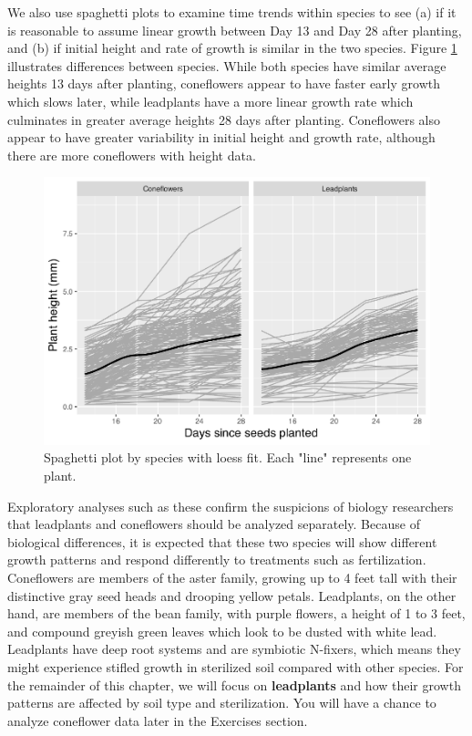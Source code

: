 \documentclass[
]{krantz}
\begin{document}
We also use spaghetti plots to examine time trends within species to see (a) if it is reasonable to assume linear growth between Day 13 and Day 28 after planting, and (b) if initial height and rate of growth is similar in the two species. Figure \ref{fig:spagbyspec} illustrates differences between species. While both species have similar average heights 13 days after planting, coneflowers appear to have faster early growth which slows later, while leadplants have a more linear growth rate which culminates in greater average heights 28 days after planting. Coneflowers also appear to have greater variability in initial height and growth rate, although there are more coneflowers with height data.

\begin{figure}

{\centering \includegraphics[width=0.6\linewidth]{bookdown-BeyondMLR_files/figure-latex/spagbyspec-1} 

}

\caption{Spaghetti plot by species with loess fit.  Each "line" represents one plant.}\label{fig:spagbyspec}
\end{figure}

Exploratory analyses such as these confirm the suspicions of biology researchers that leadplants and coneflowers should be analyzed separately. Because of biological differences, it is expected that these two species will show different growth patterns and respond differently to treatments such as fertilization. Coneflowers are members of the aster family, growing up to 4 feet tall with their distinctive gray seed heads and drooping yellow petals. Leadplants, on the other hand, are members of the bean family, with purple flowers, a height of 1 to 3 feet, and compound greyish green leaves which look to be dusted with white lead. Leadplants have deep root systems and are symbiotic N-fixers, which means they might experience stifled growth in sterilized soil compared with other species. For the remainder of this chapter, we will focus on \textbf{leadplants} and how their growth patterns are affected by soil type and sterilization. You will have a chance to analyze coneflower data later in the Exercises section.
\end{document}
